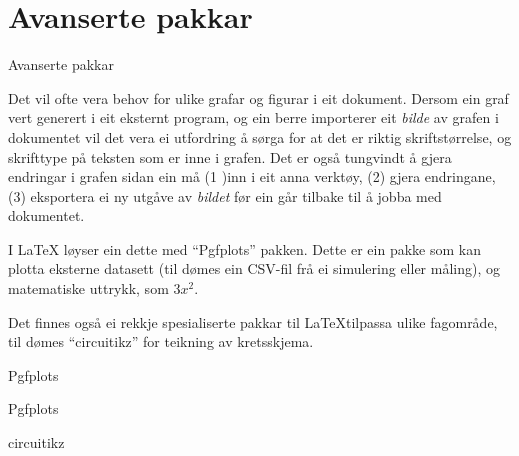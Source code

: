 \section{Avanserte pakkar}

\begin{frame}{Avanserte pakkar}

  Det vil ofte vera behov for ulike grafar og figurar i eit dokument. Dersom ein graf vert generert i eit eksternt program, og ein berre importerer eit \textit{bilde} av grafen i dokumentet vil det vera ei utfordring å sørga for at det er riktig skriftstørrelse, og skrifttype på teksten som er inne i grafen. Det er også tungvindt å gjera endringar i grafen sidan ein må (1 )inn i eit anna verktøy, (2) gjera endringane, (3) eksportera ei ny utgåve av \textit{bildet} før ein går tilbake til å jobba med dokumentet.

I \LaTeX{} løyser ein dette med ``Pgfplots'' pakken. Dette er ein pakke som kan plotta eksterne datasett (til dømes ein CSV-fil frå ei simulering eller måling), og matematiske uttrykk, som \(3x^2\).
  
  Det finnes også ei rekkje spesialiserte pakkar til \LaTeX tilpassa ulike fagområde, til dømes ``circuitikz'' for teikning av kretsskjema.
\end{frame}

\begin{frame}{Pgfplots}

  
\end{frame}

\begin{frame}{Pgfplots}

\hskip 5pt
  
\end{frame}


\begin{frame}{circuitikz}


  
\end{frame}

